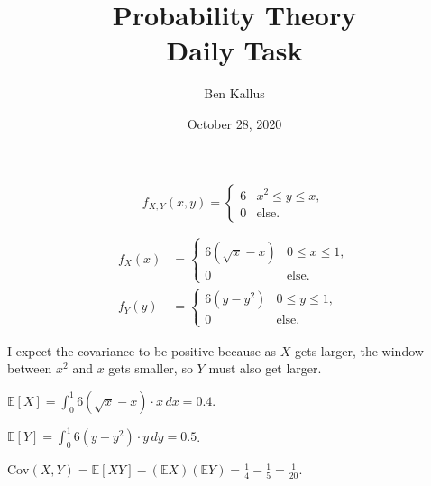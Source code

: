 \documentclass[12pt]{article}
\title{Probability Theory \\ Daily Task}
\author{Ben Kallus}
\date{October 28, 2020}
\begin{document}
\color{white}
\pagecolor{black}
\maketitle

\[f_{X,Y}(x,y) = \begin{cases} 6 & x^2 \leq y \leq x, \\ 0 & \text{else.} \end{cases}\]

\begin{align*}
    f_X(x) &= \begin{cases} 6(\sqrt x - x) & 0 \leq x \leq 1, \\ 0 & \text{else.} \end{cases} \\
    f_Y(y) &= \begin{cases} 6(y - y^2) & 0 \leq y \leq 1, \\ 0 & \text{else.} \end{cases}
\end{align*}

 I expect the covariance to be positive because as $X$ gets larger, the window between $x^2$ and $x$ gets smaller, so $Y$ must also get larger.

\medskip
{} $\mathbb E[X] = \int_0^1 6(\sqrt x - x) \cdot x\,dx = 0.4$.

\medskip
{} $\mathbb E[Y] = \int_0^1 6(y-y^2) \cdot y\,dy = 0.5$.

\medskip
{} $\text{Cov}(X,Y) = \mathbb E[XY] - (\mathbb EX)(\mathbb EY) = \frac14 - \frac15 = \frac1{20}$.
\end{document}
